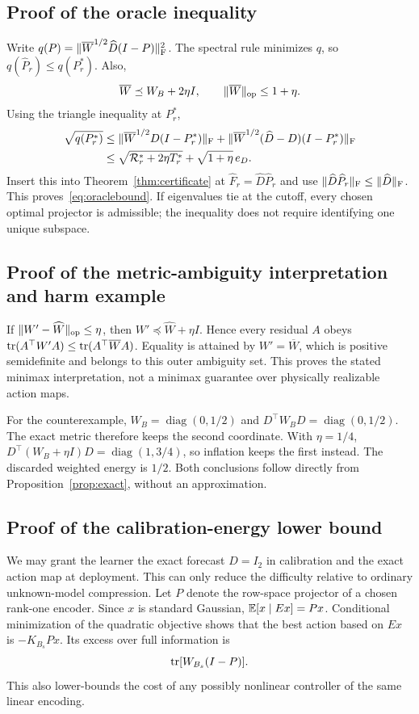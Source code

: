\subsection{Proof of the oracle inequality}
Write $q(P)=\|\overline W^{1/2}\widehat D(I-P)\|_\mathrm F^2$. The spectral rule minimizes $q$, so $q(\widehat P_r)\le q(P_r^*)$. Also,
\[
 \overline W\preceq W_B+2\eta I,\qquad
 \|\overline W\|_{\mathrm{op}}\le1+\eta.
\]
Using the triangle inequality at $P_r^*$,
\begin{align*}
 \sqrt{q(P_r^*)}
 &\le\|\overline W^{1/2}D(I-P_r^*)\|_\mathrm F
      +\|\overline W^{1/2}(\widehat D-D)(I-P_r^*)\|_\mathrm F\\
 &\le\sqrt{\mathcal R_r^*+2\eta T_r^*}+\sqrt{1+\eta}\,e_D.
\end{align*}
Insert this into Theorem~\ref{thm:certificate} at $\widehat F_r=\widehat D\widehat P_r$ and use $\|\widehat D\widehat P_r\|_\mathrm F\le\|\widehat D\|_\mathrm F$. This proves~\eqref{eq:oraclebound}. If eigenvalues tie at the cutoff, every chosen optimal projector is admissible; the inequality does not require identifying one unique subspace.

\subsection{Proof of the metric-ambiguity interpretation and harm example}
If $\|W'-\widehat W\|_{\mathrm{op}}\le\eta$, then $W'\preceq\widehat W+\eta I$. Hence every residual $A$ obeys $\operatorname{tr}(A^\top W'A)\le\operatorname{tr}(A^\top\overline W A)$. Equality is attained by $W'=\overline W$, which is positive semidefinite and belongs to this outer ambiguity set. This proves the stated minimax interpretation, not a minimax guarantee over physically realizable action maps.

For the counterexample, $W_B=\operatorname{diag}(0,1/2)$ and $D^\top W_BD=\operatorname{diag}(0,1/2)$. The exact metric therefore keeps the second coordinate. With $\eta=1/4$, $D^\top(W_B+\eta I)D=\operatorname{diag}(1,3/4)$, so inflation keeps the first instead. The discarded weighted energy is $1/2$. Both conclusions follow directly from Proposition~\ref{prop:exact}, without an approximation.

\subsection{Proof of the calibration-energy lower bound}
We may grant the learner the exact forecast $D=I_2$ in calibration and the exact action map at deployment. This can only reduce the difficulty relative to ordinary unknown-model compression. Let $P$ denote the row-space projector of a chosen rank-one encoder. Since $x$ is standard Gaussian, $\mathbb E[x\mid Ex]=Px$. Conditional minimization of the quadratic objective shows that the best action based on $Ex$ is $-K_{B_s}Px$. Its excess over full information is
\[
 \operatorname{tr}[W_{B_s}(I-P)].
\]
This also lower-bounds the cost of any possibly nonlinear controller of the same linear encoding.

